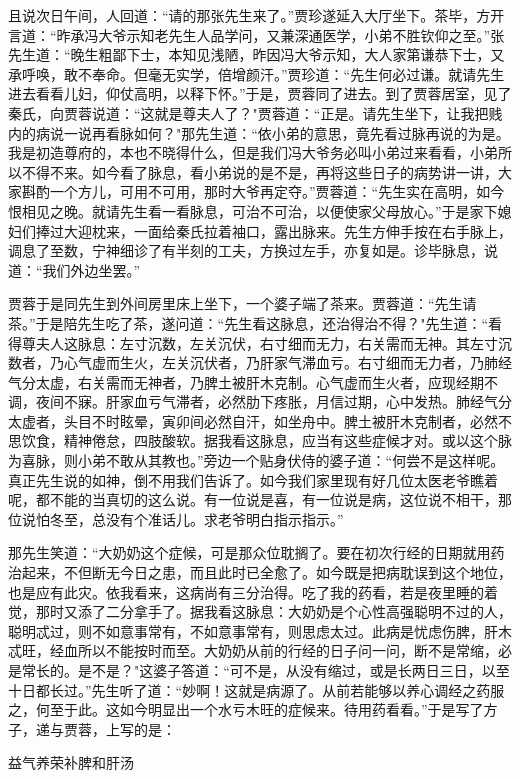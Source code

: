 且说次日午间，人回道：“请的那张先生来了。”贾珍遂延入大厅坐下。茶毕，方开言道：“昨承冯大爷示知老先生人品学问，又兼深通医学，小弟不胜钦仰之至。”张先生道：“晚生粗鄙下士，本知见浅陋，昨因冯大爷示知，大人家第谦恭下士，又承呼唤，敢不奉命。但毫无实学，倍增颜汗。”贾珍道：“先生何必过谦。就请先生进去看看儿妇，仰仗高明，以释下怀。”于是，贾蓉同了进去。到了贾蓉居室，见了秦氏，向贾蓉说道：“这就是尊夫人了？"贾蓉道：“正是。请先生坐下，让我把贱内的病说一说再看脉如何？"那先生道：“依小弟的意思，竟先看过脉再说的为是。我是初造尊府的，本也不晓得什么，但是我们冯大爷务必叫小弟过来看看，小弟所以不得不来。如今看了脉息，看小弟说的是不是，再将这些日子的病势讲一讲，大家斟酌一个方儿，可用不可用，那时大爷再定夺。”贾蓉道：“先生实在高明，如今恨相见之晚。就请先生看一看脉息，可治不可治，以便使家父母放心。”于是家下媳妇们捧过大迎枕来，一面给秦氏拉着袖口，露出脉来。先生方伸手按在右手脉上，调息了至数，宁神细诊了有半刻的工夫，方换过左手，亦复如是。诊毕脉息，说道：“我们外边坐罢。”

贾蓉于是同先生到外间房里床上坐下，一个婆子端了茶来。贾蓉道：“先生请茶。”于是陪先生吃了茶，遂问道：“先生看这脉息，还治得治不得？"先生道：“看得尊夫人这脉息：左寸沉数，左关沉伏，右寸细而无力，右关需而无神。其左寸沉数者，乃心气虚而生火，左关沉伏者，乃肝家气滞血亏。右寸细而无力者，乃肺经气分太虚，右关需而无神者，乃脾土被肝木克制。心气虚而生火者，应现经期不调，夜间不寐。肝家血亏气滞者，必然肋下疼胀，月信过期，心中发热。肺经气分太虚者，头目不时眩晕，寅卯间必然自汗，如坐舟中。脾土被肝木克制者，必然不思饮食，精神倦怠，四肢酸软。据我看这脉息，应当有这些症候才对。或以这个脉为喜脉，则小弟不敢从其教也。”旁边一个贴身伏侍的婆子道：“何尝不是这样呢。真正先生说的如神，倒不用我们告诉了。如今我们家里现有好几位太医老爷瞧着呢，都不能的当真切的这么说。有一位说是喜，有一位说是病，这位说不相干，那位说怕冬至，总没有个准话儿。求老爷明白指示指示。”

那先生笑道：“大奶奶这个症候，可是那众位耽搁了。要在初次行经的日期就用药治起来，不但断无今日之患，而且此时已全愈了。如今既是把病耽误到这个地位，也是应有此灾。依我看来，这病尚有三分治得。吃了我的药看，若是夜里睡的着觉，那时又添了二分拿手了。据我看这脉息：大奶奶是个心性高强聪明不过的人，聪明忒过，则不如意事常有，不如意事常有，则思虑太过。此病是忧虑伤脾，肝木忒旺，经血所以不能按时而至。大奶奶从前的行经的日子问一问，断不是常缩，必是常长的。是不是？"这婆子答道：“可不是，从没有缩过，或是长两日三日，以至十日都长过。”先生听了道：“妙啊！这就是病源了。从前若能够以养心调经之药服之，何至于此。这如今明显出一个水亏木旺的症候来。待用药看看。”于是写了方子，递与贾蓉，上写的是：

益气养荣补脾和肝汤

